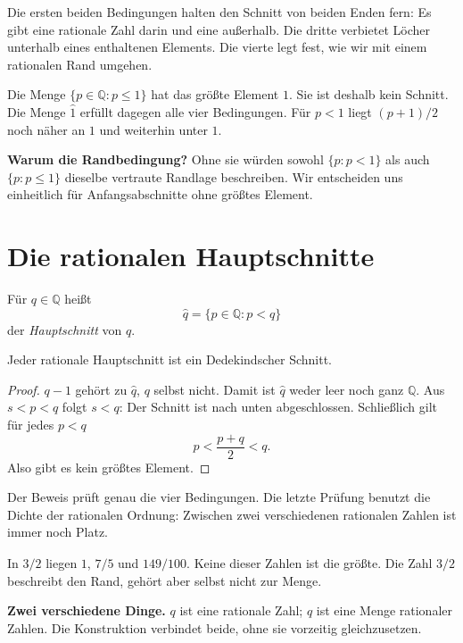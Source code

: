 Die ersten beiden Bedingungen halten den Schnitt von beiden Enden fern:
Es gibt eine rationale Zahl darin und eine außerhalb.
Die dritte verbietet Löcher unterhalb eines enthaltenen Elements.
Die vierte legt fest, wie wir mit einem rationalen Rand umgehen.

\begin{beispiel}
Die Menge $\{p\in\mathbb Q:p\leq1\}$ hat das größte Element $1$.
Sie ist deshalb kein Schnitt. Die Menge $\widehat1$ erfüllt dagegen
alle vier Bedingungen. Für $p<1$ liegt $(p+1)/2$ noch näher an $1$
und weiterhin unter $1$.
\end{beispiel}

\textbf{Warum die Randbedingung?}
Ohne sie würden sowohl $\{p:p<1\}$ als auch $\{p:p\leq1\}$
dieselbe vertraute Randlage beschreiben. Wir entscheiden uns einheitlich
für Anfangsabschnitte ohne größtes Element.

\clearpage
\section{Die rationalen Hauptschnitte}
\label{cuts:principal}

\begin{definition}
Für $q\in\mathbb Q$ heißt
\[
 \widehat q=\{p\in\mathbb Q:p<q\}
\]
der \emph{Hauptschnitt} von $q$.
\end{definition}

\begin{satz}
Jeder rationale Hauptschnitt ist ein Dedekindscher Schnitt.
\end{satz}
\begin{proof}
$q-1$ gehört zu $\widehat q$, $q$ selbst nicht.
Damit ist $\widehat q$ weder leer noch ganz $\mathbb Q$.
Aus $s<p<q$ folgt $s<q$: Der Schnitt ist nach unten abgeschlossen.
Schließlich gilt für jedes $p<q$
\[
 p<\frac{p+q}{2}<q.
\]
Also gibt es kein größtes Element.
\end{proof}

Der Beweis prüft genau die vier Bedingungen. Die letzte Prüfung benutzt
die Dichte der rationalen Ordnung: Zwischen zwei verschiedenen rationalen
Zahlen ist immer noch Platz.

\begin{beispiel}
In $\widehat{3/2}$ liegen $1$, $7/5$ und $149/100$.
Keine dieser Zahlen ist die größte. Die Zahl $3/2$ beschreibt den Rand,
gehört aber selbst nicht zur Menge.
\end{beispiel}

\textbf{Zwei verschiedene Dinge.}
$q$ ist eine rationale Zahl; $\widehat q$ ist eine Menge rationaler Zahlen.
Die Konstruktion verbindet beide, ohne sie vorzeitig gleichzusetzen.

